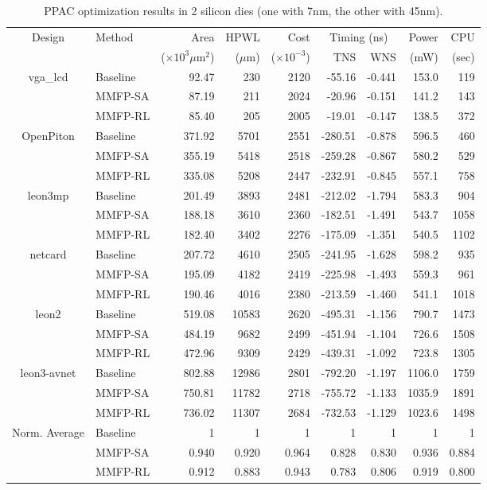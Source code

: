 \begin{table*}[!ht]
\centering
\caption{PPAC optimization results in 2 silicon dies (one with 7nm, the other with 45nm).}
\begin{tabular}{clrrrrrrr}
\hline
\multirow{2}{*}{Design} & \multirow{2}{*}{Method} & Area & HPWL & Cost & \multicolumn{2}{c}{Timing (ns)} & Power & CPU \\
\cline{6-7}
& & ($\times10^3 \mu$m$^2$) & ($\mu$m) & ($\times10^{-3}$) & TNS & WNS & (mW) & (sec) \\
\hline
\hline
\multirow{3}{*}{vga\_lcd} & Baseline & 92.47 & 230 & 2120 & -55.16 & -0.441 & 153.0 & 119 \\
& MMFP-SA & 87.19 & 211 & 2024 & -20.96 & -0.151 & 141.2 & 143 \\
& MMFP-RL & 85.40 & 205 & 2005 & -19.01 & -0.147 & 138.5 & 372 \\
\hline
\multirow{3}{*}{OpenPiton} & Baseline & 371.92 & 5701 & 2551 & -280.51 & -0.878 & 596.5 & 460 \\
& MMFP-SA & 355.19 & 5418 & 2518 & -259.28 & -0.867 & 580.2 & 529 \\
& MMFP-RL & 335.08 & 5208 & 2447 & -232.91 & -0.845 & 557.1 & 758 \\
\hline
\multirow{3}{*}{leon3mp} & Baseline & 201.49 & 3893 & 2481 & -212.02 & -1.794 & 583.3 & 904 \\
& MMFP-SA & 188.18 & 3610 & 2360 & -182.51 & -1.491 & 543.7 & 1058 \\
& MMFP-RL & 182.40 & 3402 & 2276 & -175.09 & -1.351 & 540.5 & 1102 \\
\hline
\multirow{3}{*}{netcard} & Baseline & 207.72 & 4610 & 2505 & -241.95 & -1.628 & 598.2 & 935 \\
& MMFP-SA & 195.09 & 4182 & 2419 & -225.98 & -1.493 & 559.3 & 961 \\
& MMFP-RL & 190.46 & 4016 & 2380 & -213.59 & -1.460 & 541.1 & 1018 \\
\hline
\multirow{3}{*}{leon2} & Baseline & 519.08 & 10583 & 2620 & -495.31 & -1.156 & 790.7 & 1473 \\
& MMFP-SA & 484.19 & 9682 & 2499 & -451.94 & -1.104 & 726.6 & 1508 \\
& MMFP-RL & 472.96 & 9309 & 2429 & -439.31 & -1.092 & 723.8 & 1305 \\
\hline
\multirow{3}{*}{leon3-avnet} & Baseline & 802.88 & 12986 & 2801 & -792.20 & -1.197 & 1106.0 & 1759 \\
& MMFP-SA & 750.81 & 11782 & 2718 & -755.72 & -1.133 & 1035.9 & 1891 \\
& MMFP-RL & 736.02 & 11307 & 2684 & -732.53 & -1.129 & 1023.6 & 1498 \\
\hline
\hline
\multirow{3}{*}{Norm. Average} & Baseline & 1 & 1 & 1 & 1 & 1 & 1 & 1 \\
& MMFP-SA & 0.940 & 0.920 & 0.964 & 0.828 & 0.830 & 0.936 & 0.884 \\
& MMFP-RL & 0.912 & 0.883 & 0.943 & 0.783 & 0.806 & 0.919 & 0.800 \\
\hline
\end{tabular}
\label{tab:2die_optimization}
\end{table*}



